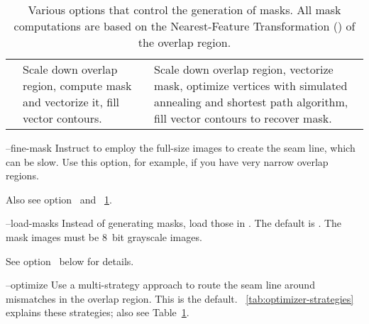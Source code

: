 \begin{codelist}
\begin{table}
\begin{tabular}{lp{.3\linewidth}p{.4\linewidth}}
      \option{--coarse-mask} & Scale down overlap region, compute \acronym{NFT} mask and
      vectorize it, fill vector contours. & Scale down overlap region, vectorize \acronym{NFT}
      mask, optimize vertices with simulated annealing and \propername{Dijkstra's} shortest path
      algorithm, fill vector contours to recover mask.
    \end{tabular}

    \caption[Mask generation options]{\label{tab:mask-generation}%
      Various options that control the generation of masks.  All mask computations are based on
      the Nearest-Feature Transformation () of the overlap region.}
  \end{table}


  \label{opt:fine-mask}%
\item[--fine-mask]\itemend
  Instruct \App{} to employ the full-size images to create the seam line, which can be slow.
  Use this option, for example, if you have very narrow overlap regions.

  Also see option~ and
  \tableName~\ref{tab:mask-generation}.


  \label{opt:load-masks}%
\item[--load-masks\optional{=\metavar{IMAGE-TEMPLATE}}]\itemend
  Instead of generating masks, load those in .  The default is
  \mbox{}.  The mask images must be 8~bit grayscale
  images.

  See option~ below for details.


  \label{opt:optimize}%
\item[--optimize]\itemend
  Use a multi-strategy approach to route the seam line around mismatches in the overlap region.
  This is the default.  \tableName~\ref{tab:optimizer-strategies} explains these strategies;
  also see Table~\ref{tab:mask-generation}.


\end{codelist}

